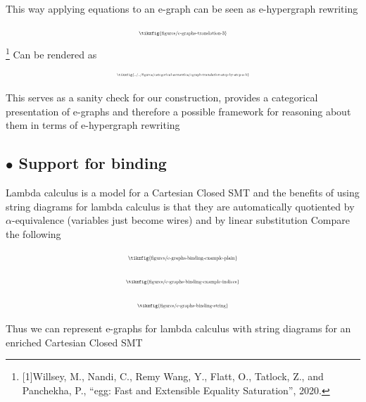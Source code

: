 \documentclass[aspectratio=169]{beamer}
\newcommand{\bsubsection}[1]{\subsection{$\bullet$ #1}}
\begin{document}
\begin{frame}{}
    \small
    This way applying equations to an e-graph can be seen as e-hypergraph rewriting

    \[
    \scalebox{0.5}{
    \tikzfig{figures/e-graphs-translation-3}
    }
    \]\footnote{[1]Willsey, M., Nandi, C., Remy Wang, Y., Flatt, O., Tatlock, Z., and Panchekha, P., “egg: Fast and Extensible Equality Saturation”, 2020.}
    Can be rendered as
    \[
        \scalebox{0.38}{
        \tikzfig{../../figures/categorical-semantics/egraph-translation-step-by-step-a-b}
        }
    \]
\end{frame}

\begin{frame}
    \vfill
    This serves as a sanity check for our construction, provides a categorical presentation of e-graphs and therefore a possible framework for reasoning about them in terms of e-hypergraph rewriting
    \vfill
\end{frame}

\bsubsection{Support for binding}

\begin{frame}{}
    \small
    \vfill
    Lambda calculus is a model for a Cartesian Closed SMT and the benefits of using string diagrams for lambda calculus is that they are automatically quotiented by $\alpha$-equivalence (variables just become wires) and by linear substitution
    \vfill
    Compare the following

    \begin{minipage}{0.3\linewidth}
        \[
        \scalebox{0.5}{
        \tikzfig{figures/e-graphs-binding-example-plain}
        }
        \]
    \end{minipage}
    \hfill
    \begin{minipage}{0.3\linewidth}
        \[
        \scalebox{0.5}{
        \tikzfig{figures/e-graphs-binding-example-indices}
        }
        \]
    \end{minipage}
    \hfill
    \begin{minipage}{0.3\linewidth}
        \[
        \scalebox{0.5}{
        \tikzfig{figures/e-graphs-binding-string}
        }
        \]
    \end{minipage}
    \vfill
    
\end{frame}

\begin{frame}
    \vfill
    Thus we can represent e-graphs for lambda calculus with string diagrams for an enriched Cartesian Closed SMT
    \vfill
\end{frame}
\end{document}
